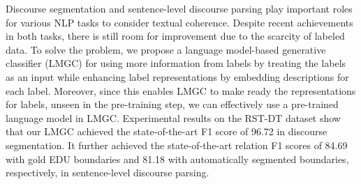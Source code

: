 Discourse segmentation and sentence-level discourse parsing play important roles for various NLP tasks to consider textual coherence. Despite recent achievements in both tasks, there is still room for improvement due to the scarcity of labeled data. To solve the problem, we propose a language model-based generative classifier (LMGC) for using more information from labels by treating the labels as an input while enhancing label representations by embedding descriptions for each label. Moreover, since this enables LMGC to make ready the representations for labels, unseen in the pre-training step, we can effectively use a pre-trained language model in LMGC. Experimental results on the RST-DT dataset show that our LMGC achieved the state-of-the-art F1 score of 96.72 in discourse segmentation. It further achieved the state-of-the-art relation F1 scores of 84.69 with gold EDU boundaries and 81.18 with automatically segmented boundaries, respectively, in sentence-level discourse parsing.
